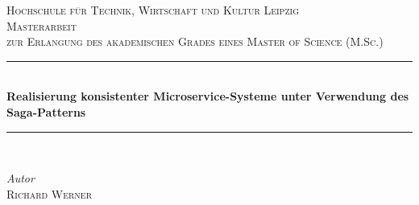 %
%
%
% 
%
	\begin{titlepage} 
		\newcommand{\HRule}{\rule{\linewidth}{0.5mm}}
		
		\center
		
		
		\textsc{\LARGE Hochschule für Technik, Wirtschaft und Kultur Leipzig}\\[1.5cm] %
		
		\textsc{\Large Masterarbeit}\\[0.5cm] 
		
		\textsc{\large zur Erlangung des akademischen Grades eines Master of Science (M.Sc.)}\\[0.5cm]
		
		
		\HRule\\[0.4cm]

		{\huge\bfseries Realisierung konsistenter Microservice-Systeme unter Verwendung des Saga-Patterns}\\[0.4cm]
		
		\HRule\\[1.5cm]
		
		
		\begin{minipage}{0.4\textwidth}
			\begin{flushleft}
				\large
				\textit{Autor}\\
				\textsc{Richard Werner}
			\end{flushleft}
		\end{minipage}
		~
		\begin{minipage}{0.4\textwidth}
			\begin{flushright}
				\large
			\end{flushright}
		\end{minipage}
		

\end{titlepage}
